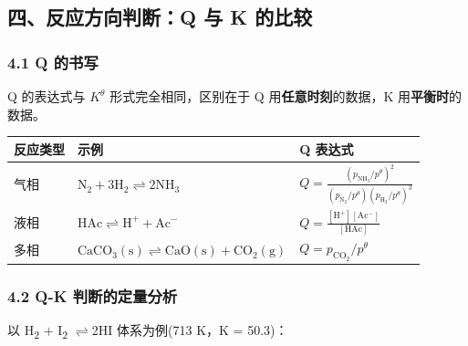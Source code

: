 \documentclass[a4paper,11pt]{ctexart}
\newcounter{none}
\newcommand{\箭}{\ensuremath{\rightarrow}}
\newcommand{\左箭}{\ensuremath{\leftarrow}}
\newcommand{\上箭}{\ensuremath{\uparrow}}
\newcommand{\下箭}{\ensuremath{\downarrow}}
\newcommand{\衡}{\ensuremath{\rightleftharpoons}}
\newcommand{\双箭}{\ensuremath{\leftrightarrow}}
\newcommand{\约等于}{\ensuremath{\approx}}
\newcommand{\小于等于}{\ensuremath{\leq}}
\newcommand{\大于等于}{\ensuremath{\geq}}
\newcommand{\不等于}{\ensuremath{\neq}}
\newcommand{\西格马}{\ensuremath{\sigma}}
\newcommand{\派}{\ensuremath{\pi}}
\begin{document}
\subsection{四、反应方向判断：Q 与 K 的比较}\label{ux56dbux53cdux5e94ux65b9ux5411ux5224ux65adq-ux4e0e-k-ux7684ux6bd4ux8f83}

\subsubsection{4.1 Q 的书写}\label{q-ux7684ux4e66ux5199}

Q 的表达式与 \(K^\theta\) 形式完全相同，区别在于 Q 用\textbf{任意时刻}的数据，K 用\textbf{平衡时}的数据。

{\def\LTcaptype{none} %
\begin{longtable}[]{@{}
  >{\raggedright\arraybackslash}p{}
  >{\raggedright\arraybackslash}p{}
  >{\raggedright\arraybackslash}p{}@{}}
\toprule\noalign{}
\begin{minipage}[b]{\linewidth}\raggedright
反应类型
\end{minipage} & \begin{minipage}[b]{\linewidth}\raggedright
示例
\end{minipage} & \begin{minipage}[b]{\linewidth}\raggedright
Q 表达式
\end{minipage} \\
\midrule\noalign{}
\endhead
\bottomrule\noalign{}
\endlastfoot
气相 & \(\mathrm{N_2 + 3H_2 \rightleftharpoons 2NH_3}\) & \(Q = \frac{(p_{\mathrm{NH_3}}/p^\theta)^2}{(p_{\mathrm{N_2}}/p^\theta)(p_{\mathrm{H_2}}/p^\theta)^3}\) \\
液相 & \(\mathrm{HAc \rightleftharpoons H^+ + Ac^-}\) & \(Q = \frac{[\mathrm{H^+}][\mathrm{Ac^-}]}{[\mathrm{HAc}]}\) \\
多相 & \(\mathrm{CaCO_3(s) \rightleftharpoons CaO(s) + CO_2(g)}\) & \(Q = p_{\mathrm{CO_2}}/p^\theta\) \\
\end{longtable}
}

\subsubsection{4.2 Q-K 判断的定量分析}\label{q-k-ux5224ux65adux7684ux5b9aux91cfux5206ux6790}

以 H\textsubscript{2} + I\textsubscript{2} \衡 2HI 体系为例(713 K，K = 50.3)：
\end{document}
